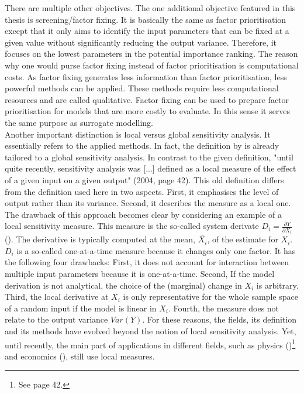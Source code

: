 \documentclass[a4paper,12pt]{article}
\begin{document}
There are multiple other objectives. The one additional objective featured in this thesis is screening/factor fixing. It is basically the same as factor prioritisation except that it only aims to identify the input parameters that can be fixed at a given value without significantly reducing the output variance. Therefore, it focuses on the lowest parameters in the potential importance ranking. The reason why one would purse factor fixing instead of factor prioritisation is computational costs. As factor fixing generates less information than factor prioritisation, less powerful methods can be applied. These methods require less computational resources and are called qualitative. Factor fixing can be used to prepare factor prioritisation for models that are more costly to evaluate. In this sense it serves the same purpose as surrogate modelling.\\

\noindent
Another important distinction is local versus global sensitivity analysis. It essentially refers to the applied methods. In fact, the definition by \cite{Saltelli.2004} is already tailored to a global sensitivity analysis. In contrast to the given definition, "until quite recently, sensitivity analysis was [...] defined as a local measure of the effect of a given input on a given output" \citeauthor{Saltelli.2004} (2004, page 42). This old definition differs from the definition used here in two aspects. First, it emphasises the level of output rather than its variance. Second, it describes the measure as a local one. The drawback of this approach becomes clear by considering an example of a local sensitivity measure. This measure is the so-called system derivate $D_i = \frac{\partial Y}{\partial X_i}$ (\cite{rabitz1989systems}). The derivative is typically computed at the mean, $\overline{X_i}$, of the estimate for $X_i$. $D_i$ is a so-called one-at-a-time measure because it changes only one factor. It has the following four drawbacks: First, it does not account for interaction between multiple input parameters because it is one-at-a-time. Second, If the model derivation is not analytical, the choice of the (marginal) change in $X_i$ is arbitrary. Third, the local derivative at $\overline{X_i}$ is only representative for the whole sample space of a random input if the model is linear in $X_i$. Fourth, the measure does not relate to the output variance $Var(Y)$. For these reasons, the fields, its definition and its methods have evolved beyond the notion of local sensitivity analysis. Yet, until recently, the main part of applications in different fields, such as physics (\cite{Saltelli.2004})\footnote{See page 42.} and economics (\cite{Harenberg.2019}), still use local measures.
\end{document}
